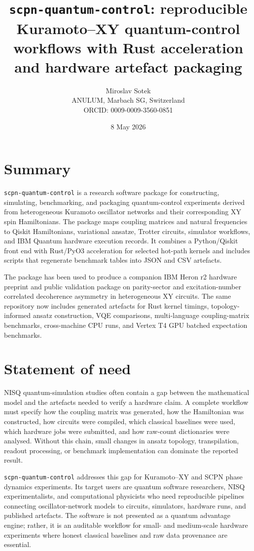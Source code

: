 \documentclass[11pt]{article}
\title{\texttt{scpn-quantum-control}: reproducible Kuramoto--XY quantum-control workflows with Rust acceleration and hardware artefact packaging}
\author{Miroslav Sotek\\ANULUM, Marbach SG, Switzerland\\ORCID: 0009-0009-3560-0851}
\date{8 May 2026}
\begin{document}
\maketitle

\section*{Summary}

\texttt{scpn-quantum-control} is a research software package for constructing,
simulating, benchmarking, and packaging quantum-control experiments derived from
heterogeneous Kuramoto oscillator networks and their corresponding XY spin
Hamiltonians. The package maps coupling matrices and natural frequencies to
Qiskit Hamiltonians, variational ansatze, Trotter circuits, simulator workflows,
and IBM Quantum hardware execution records. It combines a Python/Qiskit front
end with Rust/PyO3 acceleration for selected hot-path kernels and includes
scripts that regenerate benchmark tables into JSON and CSV artefacts.

The package has been used to produce a companion IBM Heron r2 hardware preprint
and public validation package on parity-sector and excitation-number correlated
decoherence asymmetry in heterogeneous XY circuits. The same repository now
includes generated artefacts for Rust kernel timings, topology-informed ansatz
construction, VQE comparisons, multi-language coupling-matrix benchmarks,
cross-machine CPU runs, and Vertex T4 GPU batched expectation benchmarks.

\section*{Statement of need}

NISQ quantum-simulation studies often contain a gap between the mathematical
model and the artefacts needed to verify a hardware claim. A complete workflow
must specify how the coupling matrix was generated, how the Hamiltonian was
constructed, how circuits were compiled, which classical baselines were used,
which hardware jobs were submitted, and how raw-count dictionaries were
analysed. Without this chain, small changes in ansatz topology, transpilation,
readout processing, or benchmark implementation can dominate the reported
result.

\texttt{scpn-quantum-control} addresses this gap for Kuramoto--XY and SCPN phase
dynamics experiments. Its target users are quantum software researchers, NISQ
experimentalists, and computational physicists who need reproducible pipelines
connecting oscillator-network models to circuits, simulators, hardware runs,
and published artefacts. The software is not presented as a quantum advantage
engine; rather, it is an auditable workflow for small- and medium-scale hardware
experiments where honest classical baselines and raw data provenance are
essential.
\end{document}
